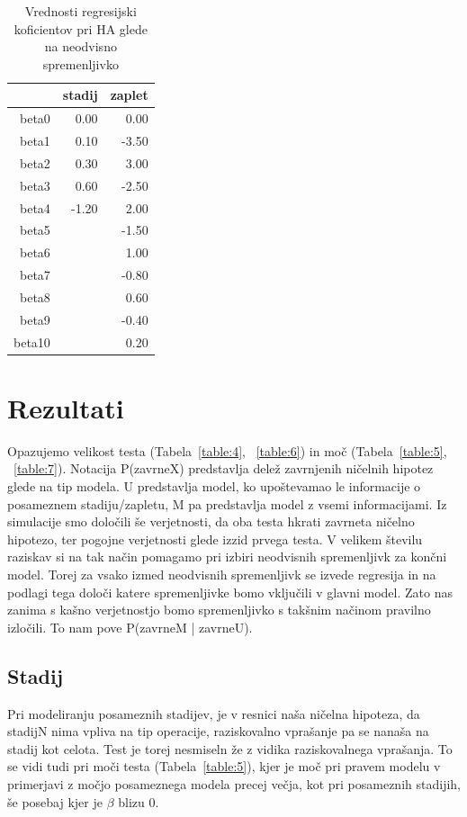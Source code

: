 \documentclass[letterpaper,11pt]{article}
\begin{document}
\begin{table}[ht]
\centering
\begin{tabular}{rrr}
  \hline
 & stadij & zaplet \\ 
  \hline
beta0 & 0.00 & 0.00 \\ 
  beta1 & 0.10 & -3.50 \\ 
  beta2 & 0.30 & 3.00 \\ 
  beta3 & 0.60 & -2.50 \\ 
  beta4 & -1.20 & 2.00 \\ 
  beta5 &  & -1.50 \\ 
  beta6 &  & 1.00 \\ 
  beta7 &  & -0.80 \\ 
  beta8 &  & 0.60 \\ 
  beta9 &  & -0.40 \\ 
  beta10 &  & 0.20 \\ 
   \hline
\end{tabular}
\caption{Vrednosti regresijski koficientov pri HA glede na neodvisno spremenljivko} 
\label{table:3}
\end{table}
\newpage
\section{Rezultati}
Opazujemo velikost testa (Tabela~\ref{table:4}, ~\ref{table:6}) in moč (Tabela~\ref{table:5}, ~\ref{table:7}). Notacija P(zavrneX) predstavlja delež zavrnjenih ničelnih hipotez glede na tip modela. U predstavlja model, ko upoštevamao le informacije o posameznem stadiju/zapletu, M pa predstavlja model z vsemi informacijami. Iz simulacije smo določili še verjetnosti, da oba testa hkrati zavrneta ničelno hipotezo, ter pogojne verjetnosti glede izzid prvega testa. V velikem številu raziskav si na tak način pomagamo pri izbiri neodvisnih spremenljivk za končni model. Torej za vsako izmed neodvisnih spremenljivk se izvede regresija in na podlagi tega določi katere spremenljivke bomo vključili v glavni model. Zato nas zanima s kašno verjetnostjo bomo spremenljivko s takšnim načinom pravilno izločili. To nam pove P(zavrneM | zavrneU). 
\subsection{Stadij}
Pri modeliranju posameznih stadijev, je v resnici naša ničelna hipoteza, da stadijN nima vpliva na tip operacije, raziskovalno vprašanje pa se nanaša na stadij kot celota. Test je torej nesmiseln že z vidika raziskovalnega vprašanja. To se vidi tudi pri moči testa (Tabela~\ref{table:5}), kjer je moč pri pravem modelu v primerjavi z močjo posameznega modela precej večja, kot pri posameznih stadijih, še posebaj kjer je $\beta$ blizu 0.
\end{document}
